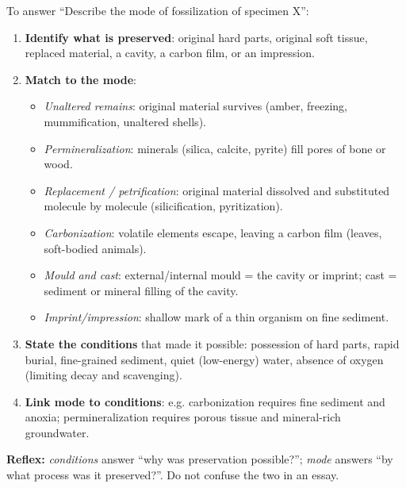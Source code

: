 \documentclass[11pt]{article}
\begin{document}
\begin{methode}
To answer ``Describe the mode of fossilization of specimen X'':
\begin{enumerate}
\item \textbf{Identify what is preserved}: original hard parts, original soft tissue, replaced material, a cavity, a carbon film, or an impression.
\item \textbf{Match to the mode}:
\begin{itemize}
\item \emph{Unaltered remains}: original material survives (amber, freezing, mummification, unaltered shells).
\item \emph{Permineralization}: minerals (silica, calcite, pyrite) fill pores of bone or wood.
\item \emph{Replacement / petrification}: original material dissolved and substituted molecule by molecule (silicification, pyritization).
\item \emph{Carbonization}: volatile elements escape, leaving a carbon film (leaves, soft-bodied animals).
\item \emph{Mould and cast}: external/internal mould = the cavity or imprint; cast = sediment or mineral filling of the cavity.
\item \emph{Imprint/impression}: shallow mark of a thin organism on fine sediment.
\end{itemize}
\item \textbf{State the conditions} that made it possible: possession of hard parts, rapid burial, fine-grained sediment, quiet (low-energy) water, absence of oxygen (limiting decay and scavenging).
\item \textbf{Link mode to conditions}: e.g. carbonization requires fine sediment and anoxia; permineralization requires porous tissue and mineral-rich groundwater.
\end{enumerate}
\textbf{Reflex:} \emph{conditions} answer ``why was preservation possible?''; \emph{mode} answers ``by what process was it preserved?''. Do not confuse the two in an essay.
\end{methode}
\end{document}
